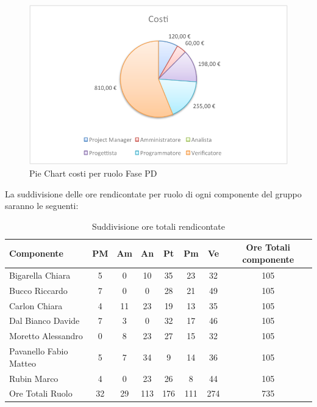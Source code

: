 				\begin{figure}[H]\centering
					\includegraphics[width=\textwidth]{PianoDiProgetto/Pics/ChartTotCostiFasePD.pdf}
					\caption{Pie Chart costi per ruolo Fase PD}
				\end{figure}
			La suddivisione delle ore rendicontate per ruolo di ogni componente del gruppo \groupname{} saranno le seguenti:
			\begin{table}[H]
				\begin{center}
					\begin{tabular}{| l | c | c | c | c | c | c | c |}
						\hline
						Componente 					& PM		& Am 	& An 		& Pt 		& Pm 		& Ve 		& Ore Totali componente \\ \hline
						
						Bigarella Chiara 			& 5 		& 0		& 10 		& 35 		& 23 		& 32 		& 105 \\
						Bucco Riccardo 				& 7 		& 0		& 0			& 28 		& 21		& 49 		& 105 \\
						Carlon Chiara	 			& 4 		& 11 	& 23 		& 19 		& 13 		& 35 		& 105 \\
						Dal Bianco Davide 			& 7 		& 3		& 0			& 32 		& 17 		& 46 		& 105 \\
						Moretto Alessandro 			& 0			& 8 	& 23 		& 27 		& 15 		& 32 		& 105 \\
						Pavanello Fabio Matteo	 	& 5 		& 7		& 34 		& 9 		& 14 		& 36 		& 105 \\
						Rubin Marco					& 4 		& 0 	& 23 		& 26 		& 8 		& 44		& 105 \\ \hline \hline
						
						Ore Totali Ruolo 			& 32 		& 29 	& 113 		& 176 		& 111 		& 274 		& 735\\ \hline
					\end{tabular}
				\end{center}
				\caption{Suddivisione ore totali rendicontate}
			\end{table}
